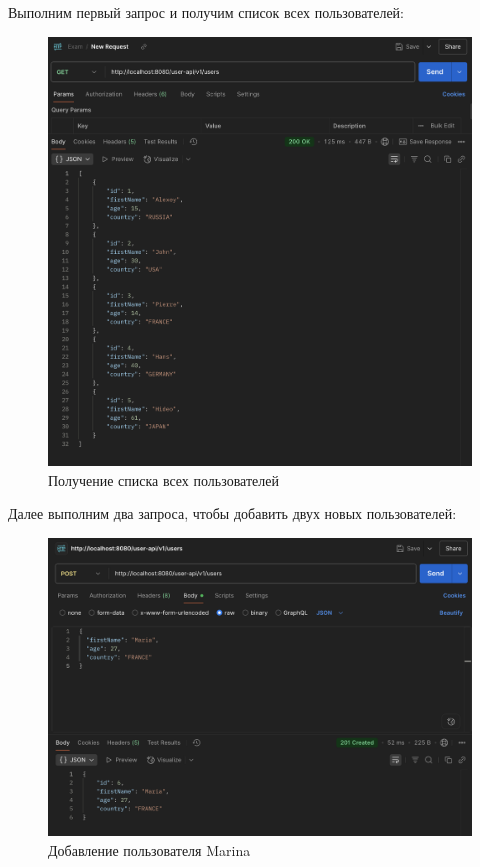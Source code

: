 \documentclass[a4paper, 14pt]{article}
\begin{document}
Выполним первый запрос и получим список всех пользователей:

\begin{figure}[H]
	\centering
	\includegraphics[width=15cm]{resources/5.png}
	\caption{Получение списка всех пользователей}
\end{figure}

Далее выполним два запроса, чтобы добавить двух новых пользователей:

\begin{figure}[H]
	\centering
	\includegraphics[width=15cm]{resources/6.png}
	\caption{Добавление пользователя Marina}
\end{figure}
\end{document}
